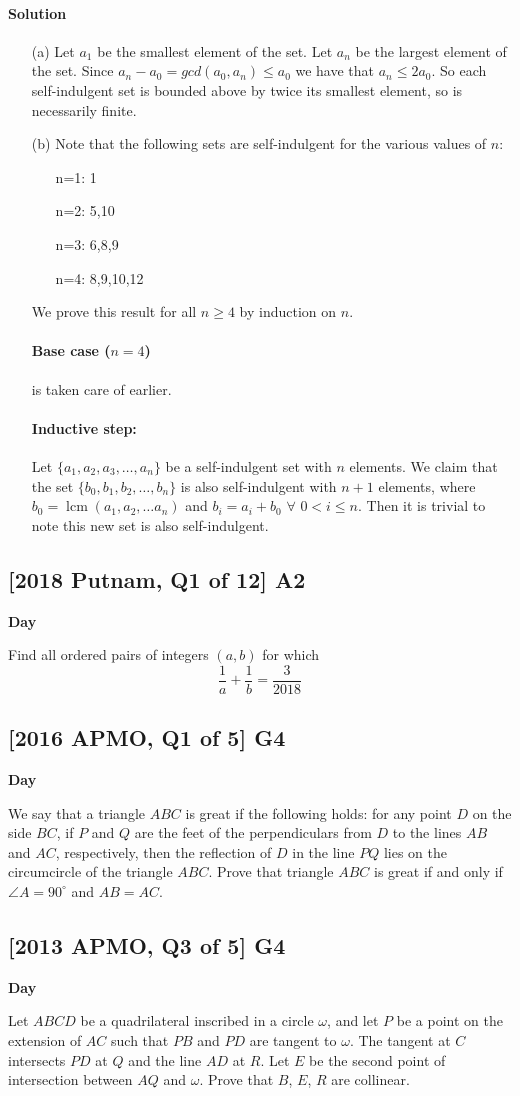 \documentclass[10pt]{article}
\DeclareMathOperator{\lcm}{lcm}
\newcommand{\themonth}{March}
\newcommand{\theyear}{2019}
\newcounter{day}
\newcounter{solution}
\newcounter{datenumber}
\newcommand{\problem}[4][0]{
	\newpage
	\subsection{[#3] \space #2} \hfill 
	{\large\textbf{Day \arabic{day}}} %
	\begin{flushleft} #4 \end{flushleft}
	\vspace{1em}
	\addtocounter{day}{1}
	\addtocounter{datenumber}{1}
	\setcounter{solution}{1}
}
\newcommand{\anonsolution}[2][0]{
	\paragraph{Solution \arabic{solution}} 
	\begin{flushleft} #2 \end{flushleft}
	\addtocounter{solution}{1}
	\vspace{1em}
}
\begin{document}
\anonsolution[53]{
\begin{itemize}
	\item[(a)] Let $a_1$ be the smallest element of the set. Let $a_n$ be the largest element of the set. Since $a_n - a_0 = gcd(a_0, a_n) \leq a_0$ we have that $a_n \leq 2a_0$. So each self-indulgent set is bounded above by twice its smallest element, so is necessarily finite. 
	\item[(b)] Note that the following sets are self-indulgent for the various values of $n$:
		\begin{itemize}
			\item[n=1:] {1}
			\item[n=2:] {5,10}
			\item[n=3:] {6,8,9}
			\item[n=4:] {8,9,10,12}
		\end{itemize}
	We prove this result for all $n \geq 4$ by induction on $n$. \\
	\paragraph{Base case ($n=4$)} is taken care of earlier. \\
	\paragraph{Inductive step:}
	Let $\{a_1, a_2, a_3, \dots , a_n\}$ be a self-indulgent set with $n$ elements. We claim that the set $\{b_0, b_1, b_2, \dots , b_n\}$ is also self-indulgent with $n+1$ elements, where $b_0 = \lcm(a_1, a_2, \dots a_n)$ and $b_i=a_i+b_0$ $\forall$ $0 < i \leq n$. Then it is trivial to note this new set is also self-indulgent. 
\end{itemize}}

\problem[54]{A2}{2018 Putnam, Q1 of 12}{Find all ordered pairs of integers $(a,b)$ for which $$\frac{1}{a}+\frac{1}{b}= \frac{3}{2018}$$}

\problem[55]{G4}{2016 APMO, Q1 of 5}{We say that a triangle $ABC$ is great if the following holds: for any point $D$ on the side $BC$, if $P$ and $Q$ are the feet of the perpendiculars from $D$ to the lines $AB$ and $AC$, respectively, then the reflection of $D$ in the line $PQ$ lies on the circumcircle of the triangle $ABC$. Prove that triangle $ABC$ is great if and only if $\angle A = 90^{\circ}$ and $AB = AC$.}

\problem[56]{G4}{2013 APMO, Q3 of 5}{Let $ABCD$ be a quadrilateral inscribed in a circle $\omega$, and let $P$ be a point on the extension of $AC$ such that $PB$ and $PD$ are tangent to $\omega$. The tangent at $C$ intersects $PD$ at $Q$ and the line $AD$ at $R$. Let $E$ be the second point of intersection between $AQ$ and $\omega$. Prove that $B$, $E$, $R$ are collinear.}
\end{document}
